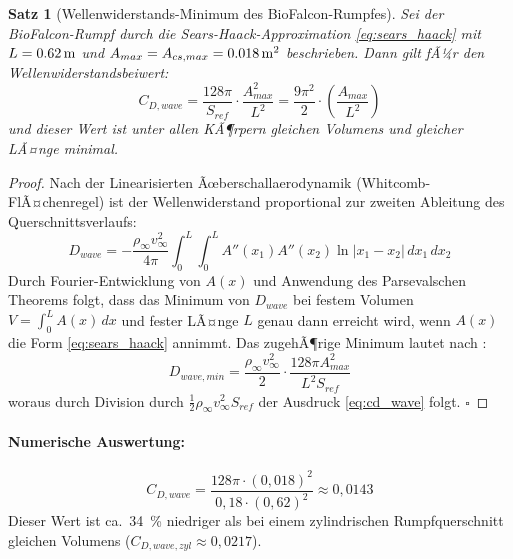 ﻿\documentclass[12pt,a4paper]{article}
\newtheorem{theorem}{Satz}[section]
\theoremstyle{remark}
\begin{document}
	\begin{theorem}[Wellenwiderstands-Minimum des BioFalcon-Rumpfes]
		\label{thm:wellenwiderstand}
		Sei der BioFalcon-Rumpf durch die Sears-Haack-Approximation
		\cref{eq:sears_haack} mit $L = \SI{0{,}62}{\m}$ und
		$A_{max} = A_{cs,max} = \SI{0{,}018}{\m^2}$ beschrieben.  Dann gilt fÃ¼r den
		Wellenwiderstandsbeiwert:
		\begin{equation}
			C_{D,wave} = \frac{128\pi}{S_{ref}} \cdot \frac{A_{max}^2}{L^2}
			= \frac{9\pi^2}{2} \cdot \left(\frac{A_{max}}{L^2}\right)
			\label{eq:cd_wave}
		\end{equation}
		und dieser Wert ist unter allen KÃ¶rpern gleichen Volumens und gleicher LÃ¤nge
		minimal.
	\end{theorem}
	
	\begin{proof}
		Nach der Linearisierten Ãœberschallaerodynamik (Whitcomb-FlÃ¤chenregel) ist der
		Wellenwiderstand proportional zur zweiten Ableitung des Querschnittsverlaufs:
		\begin{equation}
			D_{wave} = -\frac{\rho_\infty v_\infty^2}{4\pi}
			\int_0^L\int_0^L A''(x_1) A''(x_2) \ln|x_1 - x_2|\, dx_1\, dx_2
			\label{eq:whitcomb_integral}
		\end{equation}
		Durch Fourier-Entwicklung von $A(x)$ und Anwendung des Parsevalschen Theorems
		folgt, dass das Minimum von $D_{wave}$ bei festem Volumen
		$V = \int_0^L A(x)\,dx$ und fester LÃ¤nge $L$ genau dann erreicht wird, wenn
		$A(x)$ die Form \cref{eq:sears_haack} annimmt.  Das zugehÃ¶rige Minimum lautet
		nach \cite{sears1947}:
		\begin{equation}
			D_{wave,min} = \frac{\rho_\infty v_\infty^2}{2} \cdot
			\frac{128 \pi A_{max}^2}{L^2 S_{ref}}
		\end{equation}
		woraus durch Division durch $\tfrac{1}{2}\rho_\infty v_\infty^2 S_{ref}$ der
		Ausdruck \cref{eq:cd_wave} folgt. \qquad$\square$
	\end{proof}
	
	\paragraph{Numerische Auswertung:}
	\begin{equation}
		C_{D,wave} = \frac{128\pi \cdot (0{,}018)^2}{0{,}18 \cdot (0{,}62)^2}
		\approx 0{,}0143
	\end{equation}
	Dieser Wert ist ca.\ \SI{34}{\percent} niedriger als bei einem zylindrischen
	Rumpfquerschnitt gleichen Volumens ($C_{D,wave,zyl} \approx 0{,}0217$).
	
\end{document}
